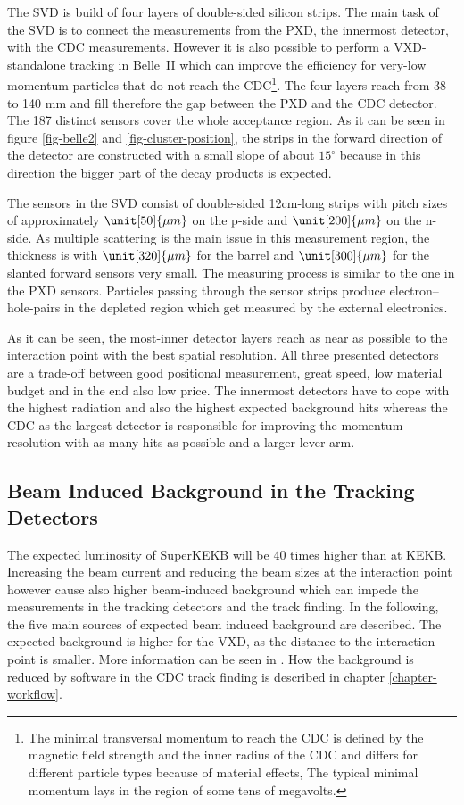 The SVD is build of four layers of double-sided silicon strips. The main task of the SVD is to connect the measurements from the PXD, the innermost detector, with the CDC measurements. However it is also possible to perform a VXD-standalone tracking in Belle~II which can improve the efficiency for very-low momentum particles that do not reach the CDC\footnote{The minimal transversal momentum to reach the CDC is defined by the magnetic field strength and the inner radius of the CDC and differs for different particle types because of material effects, The typical minimal momentum lays in the region of some tens of megavolts.}. The four layers reach from 38 to 140 mm and fill therefore the gap between the PXD and the CDC detector. The 187 distinct sensors cover the whole acceptance region. As it can be seen in figure \ref{fig-belle2} and \ref{fig-cluster-position}, the strips in the forward direction of the detector are constructed with a small slope of about $15^\circ$ because in this direction the bigger part of the decay products is expected. 

The sensors in the SVD consist of double-sided 12cm-long strips with pitch sizes of approximately $\unit[50]{\mu m}$ on the p-side and $\unit[200]{\mu m}$ on the n-side. As multiple scattering is the main issue in this measurement region, the thickness is with $\unit[320]{\mu m}$ for the barrel and $\unit[300]{\mu m}$ for the slanted forward sensors very small. The measuring process is similar to the one in the PXD sensors. Particles passing through the sensor strips produce electron--hole-pairs in the depleted region which get measured by the external electronics. 

As it can be seen, the most-inner detector layers reach as near as possible to the interaction point with the best spatial resolution. All three presented detectors are a trade-off between good positional measurement, great speed, low material budget and in the end also low price. The innermost detectors have to cope with the highest radiation and also the highest expected background hits whereas the CDC as the largest detector is responsible for improving the momentum resolution with as many hits as possible and a larger lever arm.

\subsection{Beam Induced Background in the Tracking Detectors}

The expected luminosity of SuperKEKB will be 40 times higher than at KEKB. Increasing the beam current and reducing the beam sizes at the interaction point however cause also higher beam-induced background which can impede the measurements in the tracking detectors and the track finding. In the following, the five main sources of expected beam induced background are described. The expected background is higher for the VXD, as the distance to the interaction point is smaller. More information can be seen in \cite{jakob}. How the background is reduced by software in the CDC track finding is described in chapter \ref{chapter-workflow}.

